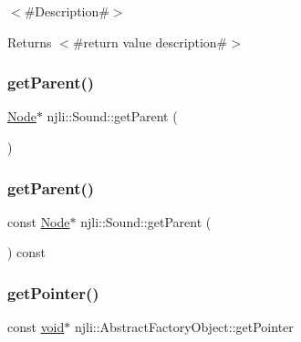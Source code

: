 $<$\#\+Description\#$>$

\begin{DoxyReturn}{Returns}
$<$\#return value description\#$>$ 
\end{DoxyReturn}
\mbox{\label{classnjli_1_1_sound_a14a65624a35ac8b64585bdabf001cdee}} 
\subsubsection{\texorpdfstring{get\+Parent()}{getParent()}\hspace{0.1cm}{\footnotesize\ttfamily [1/2]}}
{\footnotesize\ttfamily \mbox{\hyperlink{classnjli_1_1_node}{Node}}$\ast$ njli\+::\+Sound\+::get\+Parent (\begin{DoxyParamCaption}{ }\end{DoxyParamCaption})}

\mbox{\label{classnjli_1_1_sound_aba51bc1bd1f8b72ae6a02caa706f30c4}} 
\subsubsection{\texorpdfstring{get\+Parent()}{getParent()}\hspace{0.1cm}{\footnotesize\ttfamily [2/2]}}
{\footnotesize\ttfamily const \mbox{\hyperlink{classnjli_1_1_node}{Node}}$\ast$ njli\+::\+Sound\+::get\+Parent (\begin{DoxyParamCaption}{ }\end{DoxyParamCaption}) const}

\mbox{\label{classnjli_1_1_sound_ac4ca71716ed832be357f15f8262c8448}} 
\subsubsection{\texorpdfstring{get\+Pointer()}{getPointer()}}
{\footnotesize\ttfamily const \mbox{\hyperlink{_thread_8h_af1e856da2e658414cb2456cb6f7ebc66}{void}}$\ast$ njli\+::\+Abstract\+Factory\+Object\+::get\+Pointer}

